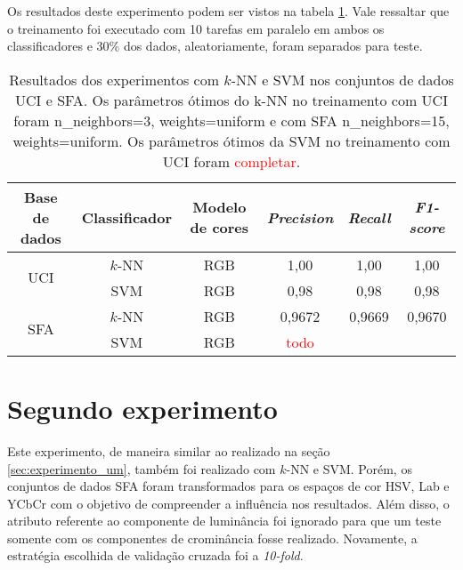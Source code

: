 Os resultados deste experimento podem ser vistos na tabela \ref{tab:resultados_experimento_um}. Vale ressaltar que o treinamento foi executado com 10 tarefas em paralelo em ambos os classificadores e 30\% dos dados, aleatoriamente, foram separados para teste.
\begin{table}[!htpb]
\centering
\begin{small}
\setlength{\tabcolsep}{8pt}

\begin{tabular}{|c|c|c|c|c|c|}\hline
 Base de dados & Classificador & Modelo de cores & \emph{Precision} & \emph{Recall} & \emph{F1-score} \\ \hline
 \multirow{2}{*}{UCI} & $k$-NN & RGB & 1,00 & 1,00 & 1,00 \\ \cline{2-6}
                      & SVM    & RGB & 0,98 & 0,98 & 0,98 \\ \hline
 \multirow{2}{*}{SFA} & $k$-NN & RGB & 0,9672 & 0,9669 & 0,9670 \\ \cline{2-6}
                      & SVM    & RGB & \textcolor{red}{todo} && \\ \hline

\end{tabular}
\end{small}
\caption[Resultados dos experimentos com $k$-NN e SVM nos conjuntos de dados UCI e SFA]{Resultados dos experimentos com $k$-NN e SVM nos conjuntos de dados UCI e SFA. Os parâmetros ótimos do k-NN no treinamento com UCI foram n\_neighbors=3, weights=uniform e com SFA n\_neighbors=15, weights=uniform. Os parâmetros ótimos da SVM no treinamento com UCI foram \textcolor{red}{completar}.}
\label{tab:resultados_experimento_um}
\end{table}


\section{Segundo experimento}
\label{sec:experimento_dois}
Este experimento, de maneira similar ao realizado na seção \ref{sec:experimento_um}, também foi realizado com $k$-NN e SVM. Porém, os conjuntos de dados SFA foram transformados para os espaços de cor HSV, Lab e YCbCr com o objetivo de compreender a influência nos resultados. Além disso, o atributo referente ao componente de luminância foi ignorado para que um teste somente com os componentes de crominância fosse realizado. Novamente, a estratégia escolhida de validação cruzada foi a \emph{10-fold}.

